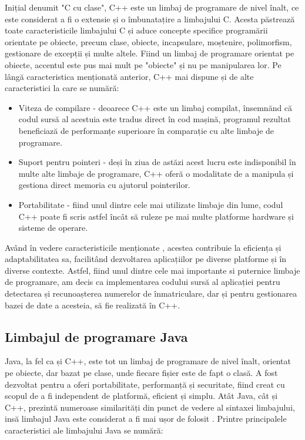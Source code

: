 \documentclass[12pt]{article}
\begin{document}
Inițial denumit "C cu clase", C++ este un limbaj de programare de nivel \^{i}nalt, ce este considerat a fi o extensie și o \^{i}mbunatațire a limbajului C. Acesta p\u{a}streaz\u{a} toate caracteristicile limbajului C și aduce concepte specifice program\u{a}rii orientate pe obiecte, precum clase, obiecte, incapsulare, moștenire, polimorfism, gestionare de excepții și multe altele. Fiind un limbaj de programare orientat pe obiecte, accentul este pus mai mult pe "obiecte" și nu pe manipularea lor. Pe l\^{a}ng\u{a} caracteristica menționat\u{a} anterior, C++ mai dispune și de alte caracteristici la care se num\u{a}r\u{a}: 

\begin{itemize}
    \item Viteza de compilare - deoarece C++ este un limbaj compilat, \^{i}nsemn\u{a}nd c\u{a} codul surs\u{a} al acestuia este tradus direct \^{i}n cod mașin\u{a}, programul rezultat beneficiaz\u{a} de performanțe superioare \^{i}n comparație cu alte limbaje de programare.
    \item Suport pentru pointeri - deși \^{i}n ziua de ast\u{a}zi acest lucru este indisponibil \^{i}n multe alte limbaje de programare, C++ ofer\u{a} o modalitate de a manipula și gestiona direct memoria cu ajutorul pointerilor.
    \item Portabilitate - fiind unul dintre cele mai utilizate limbaje din lume, codul C++ poate fi scris astfel \^{i}nc\^{a}t s\u{a} ruleze pe mai multe platforme hardware și sisteme de operare.
    
\end{itemize}

Av\^{a}nd \^{i}n vedere caracteristicile menționate \cite{cppref}, acestea contribuie la eficiența și adaptabilitatea sa, facilit\^{a}nd dezvoltarea aplicațiilor pe diverse platforme și \^{i}n diverse contexte. Astfel, fiind unul dintre cele mai importante si puternice limbaje de programare, am decis ca implementarea codului surs\u{a} al aplicației pentru detectarea și recunoașterea numerelor de \^{i}nmatriculare, dar și pentru gestionarea bazei de date a acesteia, s\u{a} fie realizat\u{a} \^{i}n C++.

\subsection{Limbajul de programare Java}

Java, la fel ca și C++, este tot un limbaj de programare de nivel \^{i}nalt, orientat pe obiecte, dar bazat pe clase, unde fiecare fișier este de fapt o clas\u{a}. A fost dezvoltat pentru a oferi portabilitate, performanț\u{a} și securitate, fiind creat cu scopul de a fi independent de platform\u{a}, eficient și simplu. At\^{a}t Java, c\^{a}t și C++, prezint\u{a} numeroase similarit\u{a}ți din punct de vedere al sintaxei limbajului, ins\u{a} limbajul Java este considerat a fi mai ușor de folosit \cite{javaref}. Printre principalele caracteristici ale limbajului Java se num\u{a}r\u{a}:
\end{document}
